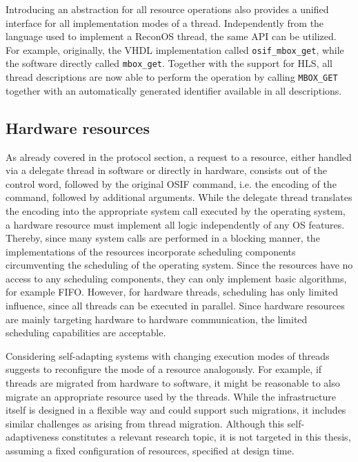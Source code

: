 Introducing an abstraction for all resource operations also provides a unified
interface for all implementation modes of a thread. Independently from the
language used to implement a ReconOS thread, the same \ac{API} can be
utilized. For example, originally, the \ac{VHDL} implementation called
\lstinline{osif_mbox_get}, while the software directly called
\lstinline{mbox_get}. Together with the support for \ac{HLS}, all thread
descriptions are now able to perform the operation by calling
\lstinline{MBOX_GET} together with an automatically generated identifier
available in all descriptions.

\subsection{Hardware resources}
As already covered in the protocol section, a request to a resource, either
handled via a delegate thread in software or directly in hardware, consists
out of the control word, followed by the original \ac{OSIF} command, i.e. the
encoding of the command, followed by additional arguments. While the delegate
thread translates the encoding into the appropriate system call executed by
the operating system, a hardware resource must implement all logic
independently of any \ac{OS} features. Thereby, since many system calls are
performed in a blocking manner, the implementations of the resources
incorporate scheduling components circumventing the scheduling of the
operating system. Since the resources have no access to any scheduling
components, they can only implement basic algorithms, for example \acl{FIFO}.
However, for hardware threads, scheduling has only limited influence, since
all threads can be executed in parallel. Since hardware resources are mainly
targeting hardware to hardware communication, the limited scheduling
capabilities are acceptable.

Considering self-adapting systems with changing execution modes of threads
suggests to reconfigure the mode of a resource analogously. For example, if
threads are migrated from hardware to software, it might be reasonable to also
migrate an appropriate resource used by the threads. While the infrastructure
itself is designed in a flexible way and could support such migrations, it
includes similar challenges as arising from thread migration. Although this
self-adaptiveness constitutes a relevant research topic, it is not targeted in
this thesis, assuming a fixed configuration of resources, specified at design
time.

